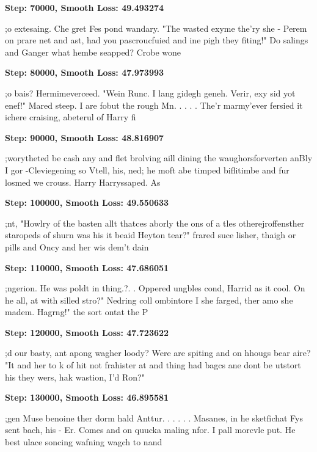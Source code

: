 \vspace{1em}
\textbf{Step: 70000, Smooth Loss: 49.493274}
\begin{spverbatim}
;o extesaing. Che gret Fes pond wandary.
"The wasted exyme the'ry she - Perem on prare net and ast, had you pascroucfuied and ine pigh they fiting!"
Do salings and Ganger what hembe seapped? Crobe wone
\end{spverbatim}
\vspace{1em}
\textbf{Step: 80000, Smooth Loss: 47.973993}
\begin{spverbatim}
;o bais?  Hermimeverceed.  "Wein Runc.  I lang gidegh geneh.
Verir, exy sid yot enef!"
Mared steep.  I are fobut the rough Mn. . . . .  The'r marmy'ever fersied it ichere craising, abeterul of Harry fi
\end{spverbatim}
\vspace{1em}
\textbf{Step: 90000, Smooth Loss: 48.816907}
\begin{spverbatim}
;worytheted be cash any and flet brolving aill dining the waughorsforverten anBly I gor -Cleviegening so Vtell, his, ned; he moft abe timped biflitimbe and fur losmed we crouss.
	Harry Harryssaped.  As
\end{spverbatim}
\vspace{1em}
\textbf{Step: 100000, Smooth Loss: 49.550633}
\begin{spverbatim}
;nt, "Howlry of the basten allt thatces aborly the ons of a tles otherejroffensther staropeds of shurn was his it beaid Heyton tear?" frared suce lisher, thaigh or pills and Oncy and her wis dem't dain
\end{spverbatim}
\vspace{1em}
\textbf{Step: 110000, Smooth Loss: 47.686051}
\begin{spverbatim}
;ngerion.  He was poldt in thing.?. .
Oppered ungbles cond, Harrid as it cool.  On he all, at with silled stro?"
Nedring coll ombintore I she farged, ther amo she madem.  Hagrng!"  the sort ontat the P
\end{spverbatim}
\vspace{1em}
\textbf{Step: 120000, Smooth Loss: 47.723622}
\begin{spverbatim}
;d our basty, ant apong wagher loody?  Were are spiting and on hhougs bear aire?  "It and her to k of hit not frahister at and thing had bagcs ane dont be utstort his they wers, hak wastion, I'd Ron?" 
\end{spverbatim}
\vspace{1em}
\textbf{Step: 130000, Smooth Loss: 46.895581}
\begin{spverbatim}
;gen Muse benoine ther dorm hald  Anttur. . . . . . Masanes, in he sketfichat Fys sent bach, his - Er. Comes and on quucka maling nfor.  I pall morcvle put.  He best ulace soncing wafning wagch to nand
\end{spverbatim}
